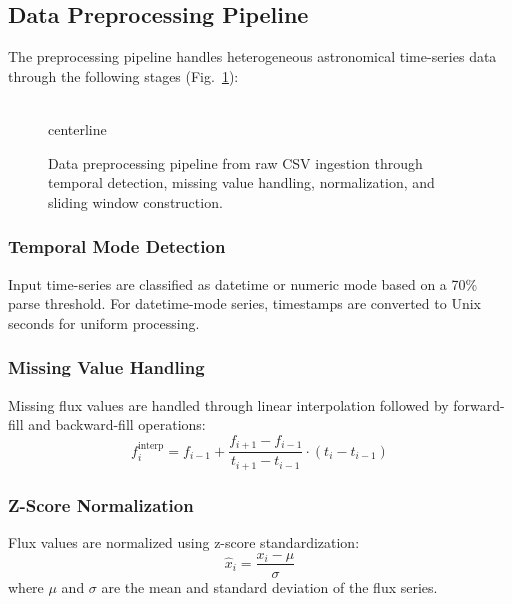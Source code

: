 \documentclass[conference]{IEEEtran}
\begin{document}
\subsection{Data Preprocessing Pipeline}

The preprocessing pipeline handles heterogeneous astronomical time-series data through the following stages (Fig.~\ref{fig:preprocessing}):

\begin{figure}[htbp]
\\centerline{
}
\caption{Data preprocessing pipeline from raw CSV ingestion through temporal detection, missing value handling, normalization, and sliding window construction.}
\label{fig:preprocessing}
\end{figure}

\subsubsection{Temporal Mode Detection}
Input time-series are classified as datetime or numeric mode based on a 70\% parse threshold. For datetime-mode series, timestamps are converted to Unix seconds for uniform processing.

\subsubsection{Missing Value Handling}
Missing flux values are handled through linear interpolation followed by forward-fill and backward-fill operations:
\begin{equation}
f_i^{\text{interp}} = f_{i-1} + \frac{f_{i+1} - f_{i-1}}{t_{i+1} - t_{i-1}} \cdot (t_i - t_{i-1})
\end{equation}

\subsubsection{Z-Score Normalization}
Flux values are normalized using z-score standardization:
\begin{equation}
\hat{x}_i = \frac{x_i - \mu}{\sigma}
\end{equation}
where $\mu$ and $\sigma$ are the mean and standard deviation of the flux series.
\end{document}
